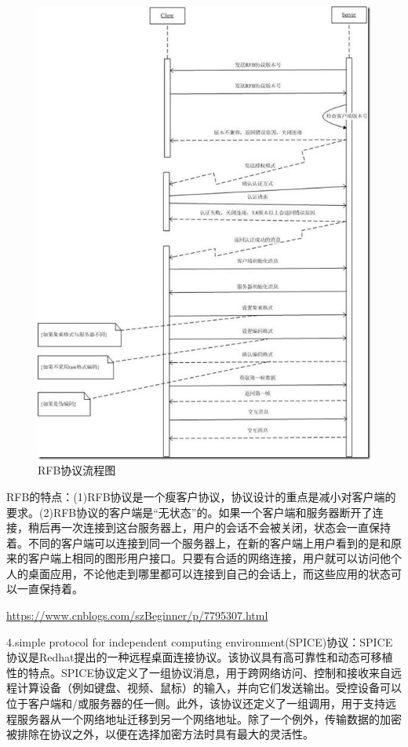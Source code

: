 \documentclass[a4paper,twoside]{scrbook}
\begin{document}
\begin{CJK}{UTF8}{gbsn}
\begin{figure}[!htbp]
\centering
\includegraphics[width=1\textwidth]{Figures/RFB.png}
\caption{RFB协议流程图}
\label{fig:RFB}
\end{figure}

RFB的特点：(1)RFB协议是一个瘦客户协议，协议设计的重点是减小对客户端的要求。(2)RFB协议的客户端是“无状态”的。如果一个客户端和服务器断开了连接，稍后再一次连接到这台服务器上，用户的会话不会被关闭，状态会一直保持着。不同的客户端可以连接到同一个服务器上，在新的客户端上用户看到的是和原来的客户端上相同的图形用户接口。只要有合适的网络连接，用户就可以访问他个人的桌面应用，不论他走到哪里都可以连接到自己的会话上，而这些应用的状态可以一直保持着。

\url{https://www.cnblogs.com/szBeginner/p/7795307.html}

4.simple protocol for independent computing environment(SPICE)协议：SPICE协议是Redhat提出的一种远程桌面连接协议。该协议具有高可靠性和动态可移植性的特点。SPICE协议定义了一组协议消息，用于跨网络访问、控制和接收来自远程计算设备（例如键盘、视频、鼠标）的输入，并向它们发送输出。受控设备可以位于客户端和/或服务器的任一侧。此外，该协议还定义了一组调用，用于支持远程服务器从一个网络地址迁移到另一个网络地址。除了一个例外，传输数据的加密被排除在协议之外，以便在选择加密方法时具有最大的灵活性。


\end{CJK}
\end{document}
